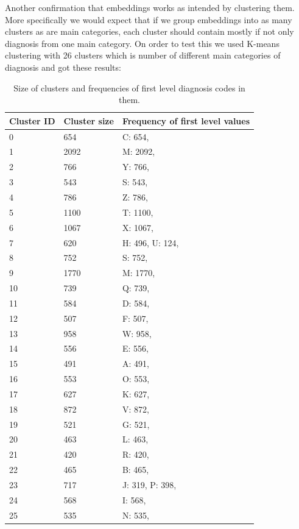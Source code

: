 Another confirmation that embeddings works as intended by clustering them. More specifically we would expect that if we group embeddings into as many clusters as are main categories, each cluster should contain mostly if not only diagnosis from one main category. On order to test this we used K-means clustering with 26 clusters which is number of different main categories of diagnosis and got these results:

\begin{table}[!h]
	\centering
	\begin{tabular}{|p{}|p{}|p{}|}
		\hline
		Cluster ID & Cluster size & Frequency of first level values \\ \hline
		0 & 654 & C: 654, \\ \hline
		1 & 2092 & M: 2092, \\ \hline
		2 & 766 & Y: 766, \\ \hline
		3 & 543 & S: 543, \\ \hline
		4 & 786 & Z: 786, \\ \hline
		5 & 1100 & T: 1100, \\ \hline
		6 & 1067 & X: 1067, \\ \hline
		7 & 620 & H: 496, U: 124, \\ \hline
		8 & 752 & S: 752, \\ \hline
		9 & 1770 & M: 1770, \\ \hline
		10 & 739 & Q: 739, \\ \hline
		11 & 584 & D: 584, \\ \hline
		12 & 507 & F: 507, \\ \hline
		13 & 958 & W: 958, \\ \hline
		14 & 556 & E: 556, \\ \hline
		15 & 491 & A: 491, \\ \hline
		16 & 553 & O: 553, \\ \hline
		17 & 627 & K: 627, \\ \hline
		18 & 872 & V: 872, \\ \hline
		19 & 521 & G: 521, \\ \hline
		20 & 463 & L: 463, \\ \hline
		21 & 420 & R: 420, \\ \hline
		22 & 465 & B: 465, \\ \hline
		23 & 717 & J: 319, P: 398, \\ \hline
		24 & 568 & I: 568, \\ \hline
		25 & 535 & N: 535, \\ \hline
	\end{tabular}
	\caption{Size of clusters and frequencies of first level diagnosis codes in them.}
	\label{tab:diag_clusters}
\end{table}

